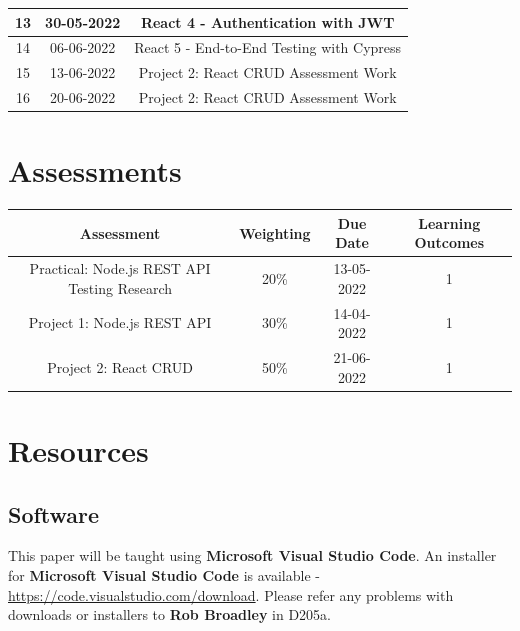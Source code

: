 \documentclass{article}
\begin{document}
\begin{tabular}{|c|c|c|c|}
	\footnotesize 13     & \footnotesize 30-05-2022 & \multicolumn{2}{c|}{\footnotesize React 4 - Authentication with JWT}    \\ \hline
	\footnotesize 14     & \footnotesize 06-06-2022 & \multicolumn{2}{c|}{\footnotesize React 5 - End-to-End Testing with Cypress}     \\ \hline
	\footnotesize 15     & \footnotesize 13-06-2022 & \multicolumn{2}{c|}{\footnotesize Project 2: React CRUD Assessment Work}     \\ \hline
	\footnotesize 16     & \footnotesize 20-06-2022 & \multicolumn{2}{c|}{\footnotesize Project 2: React CRUD Assessment Work}     \\ \hline
\end{tabular}

\section*{Assessments}
\renewcommand{\arraystretch}{1.5}
\begin{tabular}{|c|c|c|c|}
	\hline
	\textbf{Assessment}                                & \textbf{Weighting} & \textbf{Due Date} & \textbf{Learning Outcomes} \\ \hline 
	\small Practical: Node.js REST API Testing Research             & \small 20\%        & \small 13-05-2022 & \small 1                   \\ \hline
	\small Project 1: Node.js REST API                 & \small 30\%        & \small 14-04-2022 & \small 1                   \\ \hline
	\small Project 2: React CRUD                       & \small 50\%        & \small 21-06-2022 & \small 1                   \\ \hline 
\end{tabular} 

\section*{Resources}

\subsection*{Software}
This paper will be taught using \textbf{Microsoft Visual Studio Code}. An installer for \textbf{Microsoft Visual Studio Code} is available - \href{https://code.visualstudio.com/download}{https://code.visualstudio.com/download}. Please refer any problems with downloads or installers to \textbf{Rob Broadley} in D205a.
\end{document}
